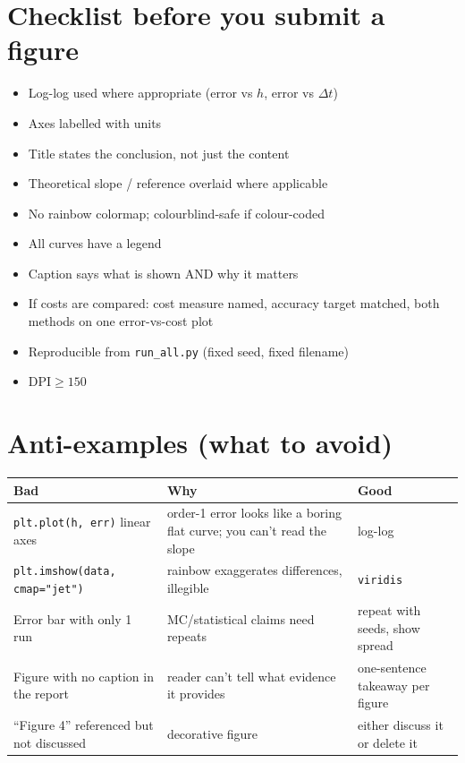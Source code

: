 \documentclass[11pt]{article}
\begin{document}
\section*{Checklist before you submit a figure}
\begin{itemize}[leftmargin=2.4em, itemsep=1pt]
  \item[$\square$] Log-log used where appropriate (error vs $h$, error vs $\Delta t$)
  \item[$\square$] Axes labelled with units
  \item[$\square$] Title states the conclusion, not just the content
  \item[$\square$] Theoretical slope / reference overlaid where applicable
  \item[$\square$] No rainbow colormap; colourblind-safe if colour-coded
  \item[$\square$] All curves have a legend
  \item[$\square$] Caption says what is shown AND why it matters
  \item[$\square$] If costs are compared: cost measure named, accuracy target matched, both methods on one error-vs-cost plot
  \item[$\square$] Reproducible from \texttt{run\_all.py} (fixed seed, fixed filename)
  \item[$\square$] $\mathrm{DPI} \geq 150$
\end{itemize}

\section*{Anti-examples (what to avoid)}
\begin{table}[h]
\centering
\small
\begin{tabular}{@{}p{3.2cm}p{5.5cm}p{2.5cm}@{}}
\toprule
Bad & Why & Good \\
\midrule
\texttt{plt.plot(h, err)} linear axes
  & order-1 error looks like a boring flat curve; you can't read the slope
  & log-log \\
\texttt{plt.imshow(data, cmap="jet")}
  & rainbow exaggerates differences, illegible
  & \texttt{viridis} \\
Error bar with only 1 run
  & MC/statistical claims need repeats
  & repeat with seeds, show spread \\
Figure with no caption in the report
  & reader can't tell what evidence it provides
  & one-sentence takeaway per figure \\
``Figure 4'' referenced but not discussed
  & decorative figure
  & either discuss it or delete it \\
\bottomrule
\end{tabular}
\end{table}
\end{document}
